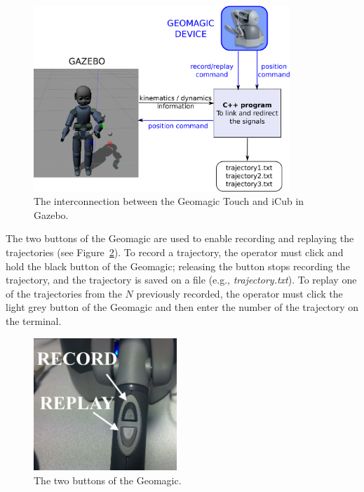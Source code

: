 \begin{figure}[h]
\centering
\includegraphics[height=7cm]{figs/geomagic_setup.pdf}
\caption{The interconnection between the Geomagic Touch and iCub in Gazebo.}
\label{fig:systemHaptic}
\end{figure}

The two buttons of the Geomagic are used to enable recording and replaying the trajectories (see Figure~\ref{fig:geobuttons}). To record a trajectory, the operator must click and hold the black button of the Geomagic; releasing the button stops recording the trajectory, and the trajectory is saved on a file (e.g., \textit{trajectory.txt}). To replay one of the trajectories from the $N$ previously recorded, the operator must click the light grey button of the Geomagic and then enter the number of the trajectory on the terminal.

\begin{figure}[h]
\centering
\includegraphics[height=5cm]{figs/geomagic_buttons.jpg}
\caption{The two buttons of the Geomagic.}
\label{fig:geobuttons}
\end{figure}


